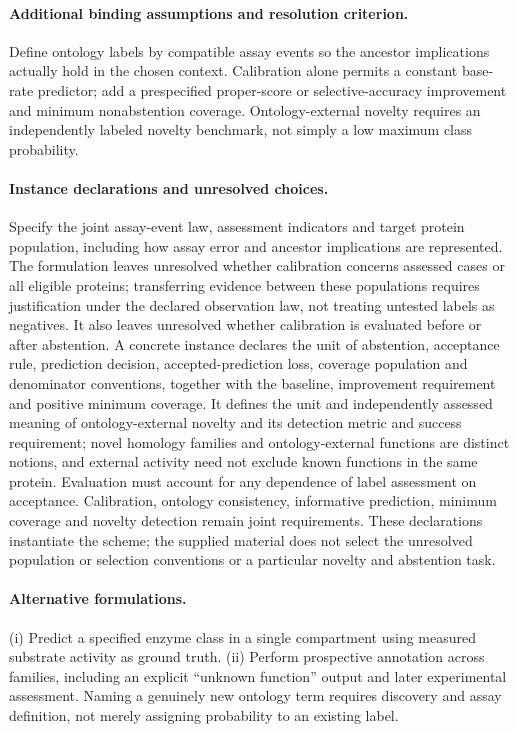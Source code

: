 \documentclass[11pt]{article}
\begin{document}
\paragraph{Additional binding assumptions and resolution criterion.} Define ontology labels by compatible assay events so the ancestor implications actually hold in the chosen context. Calibration alone permits a constant base-rate predictor; add a prespecified proper-score or selective-accuracy improvement and minimum nonabstention coverage. Ontology-external novelty requires an independently labeled novelty benchmark, not simply a low maximum class probability.
\paragraph{Instance declarations and unresolved choices.} Specify the joint assay-event law, assessment indicators and target protein population, including how assay error and ancestor implications are represented. The formulation leaves unresolved whether calibration concerns assessed cases or all eligible proteins; transferring evidence between these populations requires justification under the declared observation law, not treating untested labels as negatives. It also leaves unresolved whether calibration is evaluated before or after abstention. A concrete instance declares the unit of abstention, acceptance rule, prediction decision, accepted-prediction loss, coverage population and denominator conventions, together with the baseline, improvement requirement and positive minimum coverage. It defines the unit and independently assessed meaning of ontology-external novelty and its detection metric and success requirement; novel homology families and ontology-external functions are distinct notions, and external activity need not exclude known functions in the same protein. Evaluation must account for any dependence of label assessment on acceptance. Calibration, ontology consistency, informative prediction, minimum coverage and novelty detection remain joint requirements. These declarations instantiate the scheme; the supplied material does not select the unresolved population or selection conventions or a particular novelty and abstention task.

\paragraph{Alternative formulations.} (i) Predict a specified enzyme class in a single compartment using measured substrate activity as ground truth. (ii) Perform prospective annotation across families, including an explicit ``unknown function'' output and later experimental assessment. Naming a genuinely new ontology term requires discovery and assay definition, not merely assigning probability to an existing label.
\end{document}
